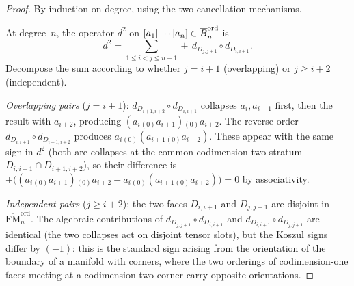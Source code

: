 \begin{proof}
By induction on degree, using the two cancellation mechanisms.

At degree~$n$, the operator $d^2$ on
$[a_1|\cdots|a_n]\in\overline{B}^{\mathrm{ord}}_n$ is
\[
d^2 = \sum_{1\le i<j\le n-1}
\pm\,d_{D_{j,j+1}}\circ d_{D_{i,i+1}}.
\]
Decompose the sum according to whether $j=i+1$
(overlapping) or $j\ge i+2$ (independent).

\emph{Overlapping pairs} ($j=i+1$):
$d_{D_{i+1,i+2}}\circ d_{D_{i,i+1}}$ collapses
$a_i,a_{i+1}$ first, then the result with $a_{i+2}$,
producing $(a_i{}_{(0)}a_{i+1}){}_{(0)}a_{i+2}$.
The reverse order
$d_{D_{i,i+1}}\circ d_{D_{i+1,i+2}}$ produces
$a_i{}_{(0)}(a_{i+1}{}_{(0)}a_{i+2})$.
These appear with the same sign in $d^2$
(both are collapses at the common codimension-two
stratum $D_{i,i+1}\cap D_{i+1,i+2}$), so their
difference is
$\pm\bigl((a_i{}_{(0)}a_{i+1}){}_{(0)}a_{i+2}
-a_i{}_{(0)}(a_{i+1}{}_{(0)}a_{i+2})\bigr)=0$
by associativity.

\emph{Independent pairs} ($j\ge i+2$):
the two faces $D_{i,i+1}$ and $D_{j,j+1}$ are disjoint
in $\overline{\mathrm{FM}}_n^{\mathrm{ord}}$. The
algebraic contributions of $d_{D_{j,j+1}}\circ d_{D_{i,i+1}}$
and $d_{D_{i,i+1}}\circ d_{D_{j,j+1}}$ are identical
(the two collapses act on disjoint tensor slots), but
the Koszul signs differ by $(-1)$: this is the standard
sign arising from the orientation of the boundary of
a manifold with corners, where the two orderings of
codimension-one faces meeting at a codimension-two corner
carry opposite orientations.
\end{proof}

